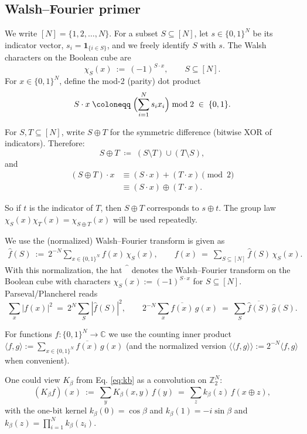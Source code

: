 \documentclass[a4paper,onecolumn,11pt,unpublished]{quantumarticle}
\theoremstyle{remark}
\begin{document}
\subsection{Walsh–Fourier primer}
\label{sec:walsh}


We write $[N]=\{1,2,\dots,N\}$. For a subset $S\subseteq[N]$, let $s\in\{0,1\}^N$
be its indicator vector, $s_i=\mathbf{1}_{\{i\in S\}}$, and we freely identify $S$ with $s$. The Walsh characters on the Boolean cube are~\cite{ODonnell2014}
\[
  \chi_S(x)\ :=\ (-1)^{S\cdot x},\qquad S\subseteq[N].
\]
For $x\in\{0,1\}^N$, define the mod-2 (parity) dot product
\[
  S\cdot x \;\coloneqq\; \Bigl(\sum_{i=1}^N s_i x_i\Bigr)\bmod 2 \;\in\; \{0,1\}.
\]

For $S,T\subseteq[N]$, write $S\oplus T$ for the symmetric difference
(bitwise XOR of indicators). Therefore:
\[
  S\oplus T \;\coloneqq\; (S\setminus T)\cup(T\setminus S),
\]
and 
\begin{align}
  (S\oplus T)\cdot x
  &\equiv (S\cdot x) + (T\cdot x) \pmod 2 \\
  &\equiv (S\cdot x)\oplus (T\cdot x).
\end{align}

So if $t$ is the indicator of $T$, then $S\oplus T$ corresponds to $s\oplus t$. The group law $\chi_S(x)\chi_T(x)=\chi_{S\oplus T}(x)$ will be used repeatedly. 



\medskip
\noindent
We use the (normalized) Walsh–Fourier transform is given as
\begin{align}
  \widehat{f}(S)\ :=\ 2^{-N}\!\sum_{x\in\{0,1\}^N} f(x)\,\chi_S(x),
  \qquad
  f(x)\ =\ \sum_{S\subseteq[N]} \widehat{f}(S)\,\chi_S(x).
  \label{eq:ft}
\end{align}
With this normalization, the hat $\widehat{\phantom{f}}$ denotes the Walsh–Fourier transform on the Boolean cube with characters
$\chi_S(x):=(-1)^{S\cdot x}$ for $S\subseteq[N]$.   Parseval/Plancherel reads~\cite{ODonnell2014}
\[
  \sum_{x}|f(x)|^2\ =\ 2^{N}\sum_{S}|\widehat{f}(S)|^2,
  \qquad
  2^{-N}\!\sum_{x}\overline{f(x)}\,g(x)\ =\ \sum_{S}\overline{\widehat{f}(S)}\,\widehat{g}(S).
\]




For functions $f:\{0,1\}^N\to\mathbb{C}$ we use the counting inner product
\(
  \langle f,g\rangle:=\sum_{x\in\{0,1\}^N}\overline{f(x)}\,g(x)
\)
(and the normalized version
\(
  \langle\!\langle f,g\rangle\!\rangle:=2^{-N}\langle f,g\rangle
\)
when convenient). 

\medskip
\noindent
One could view $K_\beta$ from Eq. \ref{eq:kb} as a convolution on $\mathbb{Z}_2^N$:
\[
  (K_\beta f)(x)\ :=\ \sum_{y} K_\beta(x,y)\,f(y)
  \ =\ \sum_{z} k_\beta(z)\,f(x\oplus z),
\]
with the one-bit kernel $k_\beta(0)=\cos\beta$ and $k_\beta(1)=-i\sin\beta$ and
$k_\beta(z)=\prod_{i=1}^N k_\beta(z_i)$.
\end{document}
